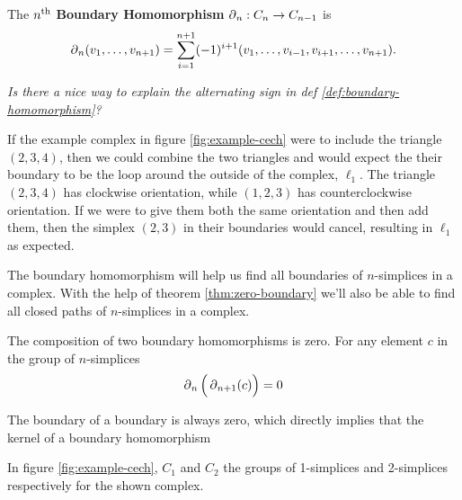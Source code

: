 \begin{definition}\label{def:boundary-homomorphism}
    The \(n\textsuperscript{th}\) \textbf{Boundary Homomorphism} \(\operatorname{\partial}_n : C_n \to C_{n-1}\) is
    \[
        \operatorname{\partial}_n (v_1,\dots , v_{n+1}) = \sum_{i=1}^{n+1} (-1)^{i+1}
        (v_1,\dots, v_{i-1}, v_{i+1}, \dots, v_{n+1})
        .
    \]
    \cite{hatcher}
\end{definition}

\textit{Is there a nice way to explain the alternating sign in def \ref{def:boundary-homomorphism}?}

\begin{example}
    If the example complex in figure \ref{fig:example-cech} were to include the triangle \((2,3,4)\), then we could combine the two triangles and would expect the their boundary to be the loop around the outside of the complex, \(\ell_1\). The triangle \((2,3,4)\) has clockwise orientation, while \((1,2,3)\) has counterclockwise orientation. If we were to give them both the same orientation and then add them, then the simplex \((2,3)\) in their boundaries would cancel, resulting in \(\ell_1\) as expected.
\end{example}

The boundary homomorphism will help us find all boundaries of \(n\)-simplices in a complex. With the help of theorem \ref{thm:zero-boundary} we'll also be able to find all closed paths of \(n\)-simplices in a complex.

\begin{theorem}\label{thm:zero-boundary}
    The composition of two boundary homomorphisms is zero. For any element \(c\) in the group of \(n\)-simplices
    \begin{align*}
		\operatorname{\partial}_{n} \Big( \operatorname{\partial}_{n+1} (c) \Big) = 0
	\end{align*}
\end{theorem}

The boundary of a boundary is always zero, which directly implies that the kernel of a boundary homomorphism





In figure \ref{fig:example-cech}, \(C_1\) and \(C_2\) the groups of 1-simplices and 2-simplices respectively for the shown complex.

